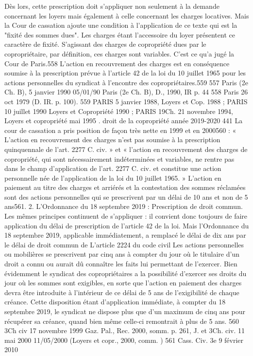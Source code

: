 Dès lors, cette prescription doit s'appliquer non seulement à la demande concernant les loyers mais également à celle concernant les charges locatives.
Mais la Cour de cassation ajoute une condition à l'application de ce texte qui est la "fixité des sommes dues". Les charges étant l’accessoire du loyer présentent ce caractère de fixité.
S’agissant des charges de copropriété dues par le copropriétaire, par définition, ces charges sont variables. C'est ce qu'a jugé la Cour de Paris.558
L'action en recouvrement des charges est en conséquence soumise à la prescription prévue à l'article 42 de la loi du 10 juillet 1965 pour les actions personnelles du syndicat à l'encontre des copropriétaires.559
557 Paris (2e Ch. B), 5 janvier 1990 05/01/90 Paris (2e Ch. B), D., 1990, IR p. 44
558 Paris 26 oct 1979 (D. IR. p. 100).
559 PARIS 5 janvier 1988, Loyers et Cop. 1988 ; PARIS 10 juillet 1990 Loyers et Copropriété 1990 ; PARIS 19\degres Ch. 21 novembre 1994, Loyers et copropriété mai 1995 .
droit de la copropriété année 2019-2020
441
La cour de cassation a pris position de façon très nette en 1999 et en 2000560 :
« L'action en recouvrement des charges n'est pas soumise à la prescription quinquennale de l'art. 2277 C. civ. » et « l'action en recouvrement des charges de copropriété, qui sont nécessairement indéterminées et variables, ne rentre pas dans le champ d'application de l'art. 2277 C. civ. et constitue une action personnelle née de l'application de la loi du 10 juillet 1965. »
L’action en paiement au titre des charges et arriérés et la contestation des sommes réclamées sont des actions personnelles qui se prescrivent par un délai de 10 ans et non de 5 ans561.
2. L’Ordonnance du 18 septembre 2019 : Prescription de droit commun.
Les mêmes principes continuent de s’appliquer : il convient donc toujours de faire application du délai de prescription de l’article 42 de la loi.
Mais l’Ordonnance du 18 septembre 2019, applicable immédiatement, a remplacé le délai de dix ans par le délai de droit commun de
L’article 2224 du code civil
Les actions personnelles ou mobilières se prescrivent par cinq ans à compter du jour où le titulaire d'un droit a connu ou aurait dû connaître les faits lui permettant de l'exercer.
Bien évidemment le syndicat des copropriétaires a la possibilité d’exercer ses droits du jour où les sommes sont exigibles, en sorte que l’action en paiement des charges devra être introduite à l’intérieur de ce délai de 5 ans de l’exigibilité de chaque créance.
Cette disposition étant d’application immédiate, à compter du 18 septembre 2019, le syndicat ne dispose plus que d’un maximum de cinq ans pour récupérer sa créance, quand bien même celle-ci remontrait à plus de 5 ans.
560 3\degres Ch civ 17 novembre 1999 Gaz. Pal., Rec. 2000, somm. p. 261, J.  et 3\degres Ch. civ. 11 mai 2000 11/05/2000 (Loyers et copr., 2000, comm. )
561 Cass. Civ. 3e 9 février 2010